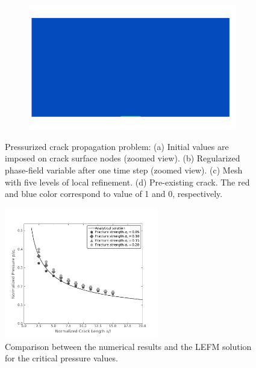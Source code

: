 \begin{figure}[htbp!]
\begin{subfigure}[t]{0.475\linewidth}
    \caption{}
    \label{fig:sneddon_mesh}
  \end{subfigure}
  \begin{subfigure}[t]{0.475\linewidth}\centering
    \includegraphics[width=\linewidth]{Chapter3/figures/sneddon_c}
    \caption{}
    \label{fig:sneddon_c}
  \end{subfigure}
  \caption[Sneddon benchmark problem.]{\label{fig:sneddon}Pressurized crack propagation problem: (a) Initial values are imposed on crack surface nodes (zoomed view). (b) Regularized phase-field variable after one time step (zoomed view). (c) Mesh with five levels of local refinement. (d) Pre-existing crack. The red and blue color correspond to value of 1 and 0, respectively.}
\end{figure}

\begin{figure}[!ht]
  \centering
  \includegraphics[width=0.6\textwidth]{Chapter3/figures/critical_pressure}
  \caption{Comparison between the numerical results and the LEFM solution for the critical pressure values.}
  \label{fig:critical_presssure}
\end{figure}

